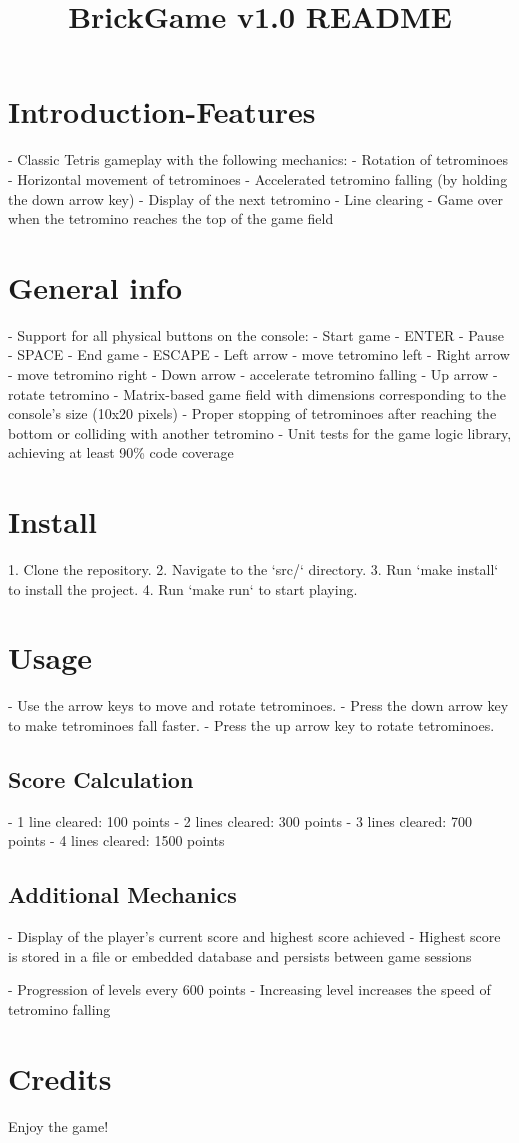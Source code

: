 \documentclass{article}
\title{BrickGame v1.0 README}
\begin{document}
\maketitle

\section{Introduction-Features}
- Classic Tetris gameplay with the following mechanics:
    - Rotation of tetrominoes
    - Horizontal movement of tetrominoes
    - Accelerated tetromino falling (by holding the down arrow key)
    - Display of the next tetromino
    - Line clearing
    - Game over when the tetromino reaches the top of the game field

\section{General info}
- Support for all physical buttons on the console:
    - Start game - ENTER
    - Pause - SPACE
    - End game - ESCAPE
    - Left arrow - move tetromino left
    - Right arrow - move tetromino right
    - Down arrow - accelerate tetromino falling
    - Up arrow - rotate tetromino
- Matrix-based game field with dimensions corresponding to the console's size (10x20 pixels)
- Proper stopping of tetrominoes after reaching the bottom or colliding with another tetromino
- Unit tests for the game logic library, achieving at least 90\% code coverage

\section{Install}
1. Clone the repository.
2. Navigate to the `src/` directory.
3. Run `make install` to install the project.
4. Run `make run` to start playing.

\section{Usage}
- Use the arrow keys to move and rotate tetrominoes.
- Press the down arrow key to make tetrominoes fall faster.
- Press the up arrow key to rotate tetrominoes.

\subsection{Score Calculation}
- 1 line cleared: 100 points
- 2 lines cleared: 300 points
- 3 lines cleared: 700 points
- 4 lines cleared: 1500 points

\subsection{Additional Mechanics}
- Display of the player's current score and highest score achieved
- Highest score is stored in a file or embedded database and persists between game sessions

- Progression of levels every 600 points
- Increasing level increases the speed of tetromino falling


\section{Credits}
Enjoy the game!
\end{document}
